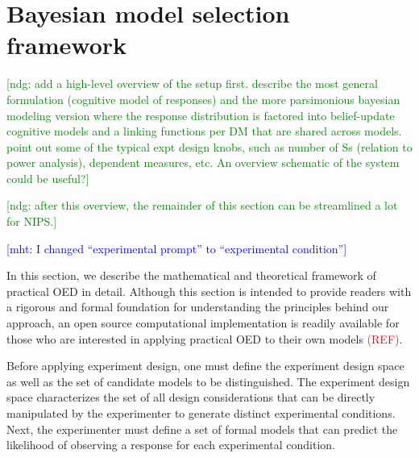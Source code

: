 \documentclass{article}
\newcommand{\red}[1]{\textcolor{Red}{#1}}
\newcommand{\ndg}[1]{\textcolor{Green}{[ndg: #1]}}
\newcommand{\mht}[1]{\textcolor{Blue}{[mht: #1]}}
\begin{document}
\section{Bayesian model selection framework}
\label{s:bayes}


\ndg{add a high-level overview of the setup first. describe the most general formulation (cognitive model of responses) and the more parsimonious bayesian modeling version where the response distribution is factored into belief-update cognitive models and a linking functions per DM that are shared across models.  point out some of the typical expt design knobs, such as number of Ss (relation to power analysis), dependent measures, etc. An overview schematic of the system could be useful?}

\ndg{after this overview, the remainder of this section can be streamlined a lot for NIPS.}

\mht{I changed ``experimental prompt'' to ``experimental condition''}

In this section, we describe the mathematical and theoretical framework of practical OED in detail. Although this section is intended to provide readers with a rigorous and formal foundation for understanding the principles behind our approach, an open source computational implementation is readily available for those who are interested in applying practical OED to their own models \red{(REF)}.

Before applying experiment design, one must define the experiment design space as well as the set of candidate models to be distinguished. The experiment design space characterizes the set of all design considerations that can be directly manipulated by the experimenter to generate distinct experimental conditions. Next, the experimenter must define a set of formal models that can predict the likelihood of observing a response for each experimental condition.
\end{document}
